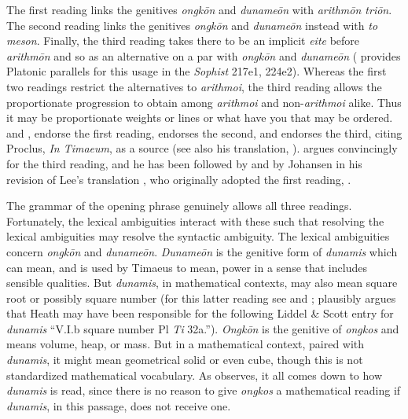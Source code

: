 The first reading links the genitives \emph{ongkōn} and \emph{dunameōn} with \emph{arithmōn triōn}. The second reading links the genitives \emph{ongkōn} and \emph{dunameōn} instead with \emph{to meson}. Finally, the third reading takes there to be an implicit \emph{eite} before \emph{arithmōn} and so as an alternative on a par with \emph{ongkōn} and \emph{dunameōn} (\citealt[99]{Taylor:1928qb} provides Platonic parallels for this usage in the \emph{Sophist} 217e1, 224e2). Whereas the first two readings restrict the alternatives to \emph{arithmoi}, the third reading allows the proportionate progression to obtain among \emph{arithmoi} and non-\emph{arithmoi} alike. Thus it may be proportionate weights or lines or what have you that may be ordered. \citet[97 n12]{Archer-Hind:1888qd} and \citet[59]{Bury:1929jb}, endorse the first reading, \citet[44]{Cornford:1935fk} endorses the second, and \citet[96--99]{Taylor:1928qb} endorses the third, citing Proclus, \emph{In Timaeum}, as a source (see also his translation, \citeyear[28]{Taylor:1929ov}). \citet{Prtichard:1990aa} argues convincingly for the third reading, and he has been followed by \citet{Zeyl:2000cs} and by Johansen in his revision of Lee's translation \citeyearpar{Lee:2008ca}, who originally adopted the first reading, \citeyearpar{Lee:1965fh}.

The grammar of the opening phrase genuinely allows all three readings. Fortunately, the lexical ambiguities interact with these such that resolving the lexical ambiguities may resolve the syntactic ambiguity. The lexical ambiguities concern \emph{ongkōn} and \emph{dunameōn}. \emph{Dunameōn} is the genitive form of \emph{dunamis} which can mean, and is used by Timaeus to mean, power in a sense that includes sensible qualities. But \emph{dunamis}, in mathematical contexts, may also mean square root or possibly square number (for this latter reading see \citealt[97 n12]{Archer-Hind:1888qd} and \citealt[294 n1]{Heath:1921ys}; \citealt[184]{Prtichard:1990aa} plausibly argues that Heath may have been responsible for the following Liddel \& Scott entry for \emph{dunamis} ``V.I.b square number Pl \emph{Ti} 32a.''). \emph{Ongkōn} is the genitive of \emph{ongkos} and means volume, heap, or mass. But in a mathematical context, paired with \emph{dunamis}, it might mean geometrical solid or even cube, though this is not standardized mathematical vocabulary. As \citet{Prtichard:1990aa} observes, it all comes down to how \emph{dunamis} is read, since there is no reason to give \emph{ongkos} a mathematical reading if \emph{dunamis}, in this passage, does not receive one. 

